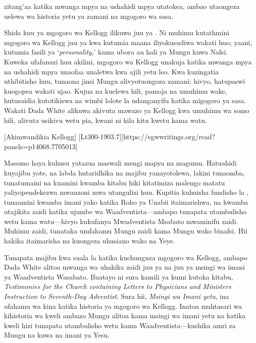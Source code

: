 zitang'aa katika mwanga mpya na ushahidi mpya utatokea, ambao utaongeza uelewa wa historia yetu ya zamani na mgogoro wa sasa.


Shida kuu ya mgogoro wa Kellogg ilikuwa juu ya . Ni muhimu kutathmini mgogoro wa Kellogg juu ya  kwa kutumia maana iliyokusudiwa wakati huo; yaani, kutumia fasili ya ‘\textit{personality},’ kama ubora au hali ya Mungu kuwa Nafsi. Kuweka ufafanuzi huu akilini, mgogoro wa Kellogg unakuja katika mwanga mpya na ushahidi mpya unaofaa unaletwa kwa ajili yetu leo. Kwa kuzingatia uthibitisho huu, tunaona jinsi Mungu alivyotuongoza zamani; hivyo, hatupaswi kuogopea wakati ujao. Kujua na kuelewa hili, pamoja na umuhimu wake, hutusaidia kutotikiswa na wimbi lolote la udanganyifu katika migogoro ya sasa. Wakati Dada White alikuwa akivuta mawazo ya Kellogg kwa umuhimu wa somo hili, alivuta usikivu wetu pia, kwani ni kila kitu kwetu kama watu.


[Akimwandikia Kellogg] [Lt300-1903.7][https://egwwritings.org/read?panels=p14068.7705013]


Masomo haya kuhusu  yatazua maswali mengi mapya na magumu. Hatuahidi kuyajibu yote, na labda hutaridhika na majibu yanayotolewa, lakini tunaomba, tunatumaini na kuamini kwamba kitabu hiki kitatimiza malengo matatu yaliyopendekezwa mwanzoni mwa utangulizi huu. Kupitia kuhuisha fundisho la , tunaamini kwamba imani yako katika Roho ya Unabii itaimarishwa, na kwamba utajikita zaidi katika ujumbe wa Waadventista—ambapo tunapata utambulisho wetu kama watu—hivyo kukufanya Mwadventista Msabato mwaminifu zaidi. Muhimu zaidi, tunataka umfahamu Mungu zaidi kama Mungu wako binafsi. Hii hakika itaimarisha na kuongeza uhusiano wako na Yeye.


Tunapata majibu kwa suala la  katika kuchunguza mgogoro wa Kellogg, ambapo Dada White alitoa mwanga wa uhakika zaidi juu ya  na juu ya msingi wa imani ya Waadventista Wasabato. Ifuatayo ni sura kamili ya kumi kutoka kitabu, \textit{Testimonies for the Church containing Letters to Physicians and Ministers Instruction to Seventh-Day Adventist}. Sura hii, \textit{Msingi wa Imani yetu}, ina ufahamu wa kina katika historia ya mgogoro wa Kellogg. Inatoa muhtasari wa kihistoria wa kweli ambazo Mungu alitoa kama msingi wa imani yetu na katika kweli hizi tunapata utambulisho wetu kama Waadventista—kushika amri za Mungu na kuwa na imani ya Yesu.
